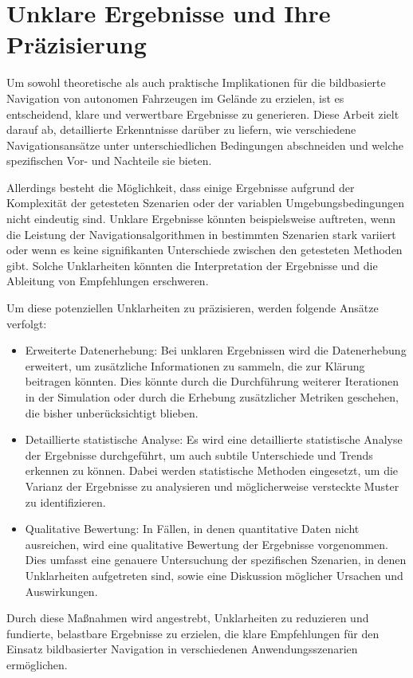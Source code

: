 \section{Unklare Ergebnisse und Ihre Präzisierung}

Um sowohl theoretische als auch praktische Implikationen für die bildbasierte Navigation von autonomen Fahrzeugen im Gelände zu erzielen, ist es entscheidend, klare und verwertbare Ergebnisse zu generieren. 
Diese Arbeit zielt darauf ab, detaillierte Erkenntnisse darüber zu liefern, wie verschiedene Navigationsansätze unter unterschiedlichen Bedingungen abschneiden und welche spezifischen Vor- und Nachteile sie bieten. 

Allerdings besteht die Möglichkeit, dass einige Ergebnisse aufgrund der Komplexität der getesteten Szenarien oder der variablen Umgebungsbedingungen nicht eindeutig sind. 
Unklare Ergebnisse könnten beispielsweise auftreten, wenn die Leistung der Navigationsalgorithmen in bestimmten Szenarien stark variiert oder wenn es keine signifikanten Unterschiede zwischen den getesteten Methoden gibt. 
Solche Unklarheiten könnten die Interpretation der Ergebnisse und die Ableitung von Empfehlungen erschweren.

Um diese potenziellen Unklarheiten zu präzisieren, werden folgende Ansätze verfolgt:

\begin{itemize}
    \item Erweiterte Datenerhebung: Bei unklaren Ergebnissen wird die Datenerhebung erweitert, um zusätzliche Informationen zu sammeln, die zur Klärung beitragen könnten. Dies könnte durch die Durchführung weiterer Iterationen in der Simulation oder durch die Erhebung zusätzlicher Metriken geschehen, die bisher unberücksichtigt blieben.
    
    \item Detaillierte statistische Analyse: Es wird eine detaillierte statistische Analyse der Ergebnisse durchgeführt, um auch subtile Unterschiede und Trends erkennen zu können. Dabei werden statistische Methoden eingesetzt, um die Varianz der Ergebnisse zu analysieren und möglicherweise versteckte Muster zu identifizieren.
    
    \item Qualitative Bewertung: In Fällen, in denen quantitative Daten nicht ausreichen, wird eine qualitative Bewertung der Ergebnisse vorgenommen. Dies umfasst eine genauere Untersuchung der spezifischen Szenarien, in denen Unklarheiten aufgetreten sind, sowie eine Diskussion möglicher Ursachen und Auswirkungen.
\end{itemize}

Durch diese Maßnahmen wird angestrebt, Unklarheiten zu reduzieren und fundierte, belastbare Ergebnisse zu erzielen, die klare Empfehlungen für den Einsatz bildbasierter Navigation in verschiedenen Anwendungsszenarien ermöglichen.
